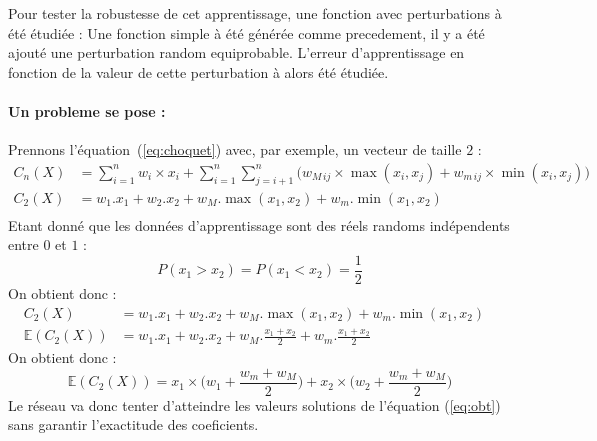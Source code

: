 Pour tester la robustesse de cet apprentissage, une fonction avec perturbations à été étudiée :
Une fonction simple à été générée comme precedement, il y a été ajouté une perturbation random equiprobable.
L’erreur d’apprentissage en fonction de la valeur de cette perturbation à alors été étudiée.\\


\paragraph{Un probleme se pose :}
Prennons l'équation\ (\ref{eq:choquet}) avec, par exemple, un vecteur de taille $2$ :
\begin{align*}
    C_n (X)
    & =
        \sum_{i=1}^{n}
                w_i \times x_i +
            \sum_{i=1}^{n}\sum_{j=i+1}^{n}
            \Big(
                w_{M\,ij} \times \max(x_i,x_j) + w_{m\,ij} \times \min(x_i,x_j)
            \Big)
    &\\
    C_2 (X)
    & =
        w_1.x_1 + w_2.x_2 + w_M.\max(x_1,x_2) + w_m.\min(x_1,x_2)
    &\\
\end{align*}
Etant donné que les données d'apprentissage sont des réels randoms indépendents entre $0$ et $1$ :
\begin{equation}
    \label{eq:proba}
    P(x_1 > x_2) = P(x_1 < x_2) = \frac{1}{2}
\end{equation}
On obtient donc :
\begin{align*}
    C_2 (X)
    & =
        w_1.x_1 + w_2.x_2 + w_M.\max(x_1,x_2) + w_m.\min(x_1,x_2)
    &\\
    \mathbb{E}(C_2 (X))
    & =
        w_1.x_1 + w_2.x_2 + w_M.\frac{x_1 + x_2}{2} + w_m.\frac{x_1 + x_2}{2}
    &
\end{align*}
On obtient donc :
\begin{equation}
    \label{eq:obt}
    \mathbb{E}(C_2 (X)) =
        x_1 \times \Big(w_1 + \frac{w_m + w_M}{2}\Big) + x_2 \times \Big(w_2 + \frac{w_m + w_M}{2}\Big)
\end{equation}
Le réseau va donc tenter d'atteindre les valeurs solutions de l'équation
(\ref{eq:obt}) sans garantir l'exactitude des coeficients.

